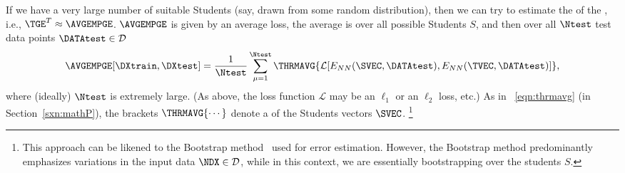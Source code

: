 If we have a very large number of suitable Students
(say, drawn from some random distribution), then we can try to estimate the 
\AverageGeneralizationError of the \Teacher, i.e., $\TGE^{T}\approx\AVGEMPGE$.
$\AVGEMPGE$ is given by an average loss, the average is 
over all possible Students $S$,  and then 
over all  $\Ntest$ test data points $\DATAtest\in\mathcal{D}$ 
\begin{align}
\AVGEMPGE[\DXtrain, \DXtest]=\frac{1}{\Ntest}\sum_{\mu=1}^{\Ntest}
\THRMAVG{\mathcal{L}[E_{NN}(\SVEC,\DATAtest),E_{NN}(\TVEC,\DATAtest)]} ,
\label{eqn:emp_gen_error}
\end{align}
where (ideally) $\Ntest$ is extremely large.
(As above, the loss function $\mathcal{L}$ may be an $\ell_1$ or an $\ell_2$ loss, etc.)
As in \EQN~\ref{eqn:thrmavg} (in Section~\ref{sxn:mathP}),
the brackets $\THRMAVG{\cdots}$ denote a \ThermalAverage of the Students vectors $\SVEC$.%
\footnote{This approach can be likened to the Bootstrap method~\cite{efron1993bootstrap} used for error estimation.  However, the Bootstrap method predominantly emphasizes variations in the input data $\NDX\in\mathcal{D}$, while in this context, we are essentially bootstrapping over the students $S$.}


